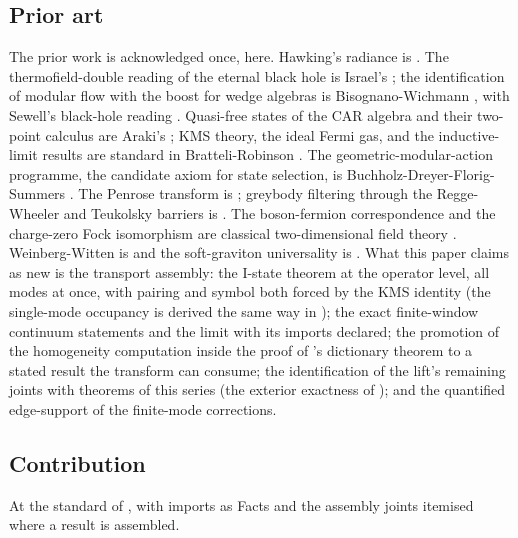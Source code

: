 \documentclass[11pt]{article}
\theoremstyle{definition}
\theoremstyle{plain}
\begin{document}
\subsection*{Prior art}
\label{c:note.hawking.setting-prior-art}
The prior work is acknowledged once, here. Hawking's radiance is \cite{Hawking1975}. The thermofield-double reading of the eternal black hole is Israel's \cite{Israel1976}; the identification of modular flow with the boost for wedge algebras is Bisognano-Wichmann \cite{BisognanoWichmann1976}, with Sewell's black-hole reading \cite{Sewell1982}. Quasi-free states of the CAR algebra and their two-point calculus are Araki's \cite{Araki1971}; KMS theory, the ideal Fermi gas, and the inductive-limit results are standard in Bratteli-Robinson \cite{BratteliRobinson1997}. The geometric-modular-action programme, the candidate axiom for state selection, is Buchholz-Dreyer-Florig-Summers \cite{BDFS2000}. The Penrose transform is \cite{Penrose1969, EPW1981}; greybody filtering through the Regge-Wheeler and Teukolsky barriers is \cite{ReggeWheeler1957, Teukolsky1973, Page1976}. The boson-fermion correspondence and the charge-zero Fock isomorphism are classical two-dimensional field theory \cite{FrenkelKac1980}. Weinberg-Witten is \cite{WeinbergWitten1980} and the soft-graviton universality is \cite{Weinberg1964}. What this paper claims as new is the transport assembly: the I-state theorem at the operator level, all modes at once, with pairing and symbol both forced by the KMS identity (the single-mode occupancy is derived the same way in \cite{ButlerT5}); the exact finite-window continuum statements and the limit with its imports declared; the promotion of the homogeneity computation inside the proof of \cite{ButlerT9}'s dictionary theorem to a stated result the transform can consume; the identification of the lift's remaining joints with theorems of this series (the exterior exactness of \cite{ButlerT6}); and the quantified edge-support of the finite-mode corrections.

\subsection*{Contribution}
\label{c:note.hawking.setting-contribution}
At the standard of \cite{ButlerT1}, with imports as Facts and the assembly joints itemised where a result is assembled.
\end{document}
